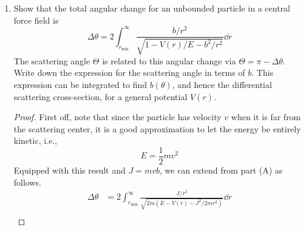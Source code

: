 \documentclass[../psets.tex]{subfiles}
\begin{document}
\begin{enumerate}
\begin{enumerate}
\begin{proof}
            First of all, because the particle is only under the influence of a central force, angular momentum is conserved. Thus, we can calculate it at any location along the trajectory and the value will hold for all time. Since we have the velocity far from the scattering center, we'll calculate $J$ there.\par
            At this point, we know that the particle's linear momentum $p=mv$, where $m$ is the mass of the particle. Additionally, since the particle is far from the scattering center, it is a good approximation to let $\vec{p}$ lie parallel to the hyperbolic trajectory's directrix (i.e., the linear path the particle would take were the scattering center not there). The position vector $\vec{r}$ then intersects $\vec{p}$ at the particle's location, forming an angle $\phi$. It follows by the definition of angular momentum that $J=rp\sin\phi$. But since $b$ is the distance from the scattering center to the directrix, trigonometry shows that $r\sin\phi=b$. Thus, returning the substitutions $p=mv$ and $b=r\sin\phi$, we obtain
            \begin{equation*}
                J = mvb
            \end{equation*}
            as desired.
        \end{proof}
        \item Show that the total angular change for an unbounded particle in a central force field is
        \begin{equation*}
            \Delta\theta = 2\int_{r_\text{min}}^\infty\frac{b/r^2}{\sqrt{1-V(r)/E-b^2/r^2}}\dd{r}
        \end{equation*}
        The scattering angle $\Theta$ is related to this angular change via $\Theta=\pi-\Delta\theta$. Write down the expression for the scattering angle in terms of $b$. This expression can be integrated to find $b(\theta)$, and hence the differential scattering cross-section, for a general potential $V(r)$.
        \begin{proof}
            First off, note that since the particle has velocity $v$ when it is far from the scattering center, it is a good approximation to let the energy be entirely kinetic, i.e.,
            \begin{equation*}
                E = \frac{1}{2}mv^2
            \end{equation*}
            Equipped with this result and $J=mvb$, we can extend from part (A) as follows.
            \begin{align*}
                \Delta\theta &= 2\int_{r_\text{min}}^\infty\frac{J/r^2}{\sqrt{2m(E-V(r)-J^2/2mr^2)}}\dd{r}\\

\end{align*}
\end{proof}
\end{enumerate}
\end{enumerate}
\end{document}
